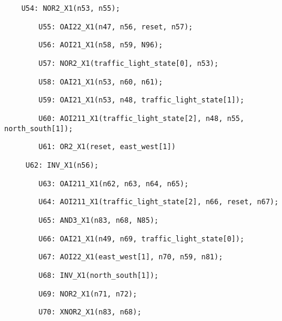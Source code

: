 \documentclass[a4paper]{article}
\begin{document}
{\centering \par}

\begin{center}
\begin{minipage}{6.03611in}
{\color[rgb]{0.0,0.0,0.039215688}
\texttt{\ \ \ \ U54: NOR2\_X1(n53, n55);}}

{\color[rgb]{0.0,0.0,0.039215688}
\texttt{\ \ \ \ \ \ \ \ U55: OAI22\_X1(n47, n56, reset, n57);}}

{\color[rgb]{0.0,0.0,0.039215688}
\texttt{\ \ \ \ \ \ \ \ U56: AOI21\_X1(n58, n59, N96);}}

{\color[rgb]{0.0,0.0,0.039215688}
\texttt{\ \ \ \ \ \ \ \ U57: NOR2\_X1(traffic\_light\_state[0], n53);}}

{\color[rgb]{0.0,0.0,0.039215688}
\texttt{\ \ \ \ \ \ \ \ U58: OAI21\_X1(n53, n60, n61);}}

{\color[rgb]{0.0,0.0,0.039215688}
\texttt{\ \ \ \ \ \ \ \ U59: OAI21\_X1(n53, n48,
traffic\_light\_state[1]);}}

{\color[rgb]{0.0,0.0,0.039215688}
\texttt{\ \ \ \ \ \ \ \ U60: AOI211\_X1(traffic\_light\_state[2], n48,
n55, north\_south[1]);}}

{\color[rgb]{0.0,0.0,0.039215688}
\texttt{\ \ \ \ \ \ \ \ U61: OR2\_X1(reset, east\_west[1])}}


\bigskip

{\color[rgb]{0.0,0.0,0.039215688}
\texttt{\ }\texttt{\ \ \ \ U62: INV\_X1(n56);}}

{\color[rgb]{0.0,0.0,0.039215688}
\texttt{\ \ \ \ \ \ \ \ U63: OAI211\_X1(n62, n63, n64, n65);}}

{\color[rgb]{0.0,0.0,0.039215688}
\texttt{\ \ \ \ \ \ \ \ U64: AOI211\_X1(traffic\_light\_state[2], n66,
reset, n67);}}

{\color[rgb]{0.0,0.0,0.039215688}
\texttt{\ \ \ \ \ \ \ \ U65: AND3\_X1(n83, n68, N85);}}

{\color[rgb]{0.0,0.0,0.039215688}
\texttt{\ \ \ \ \ \ \ \ U66: OAI21\_X1(n49, n69,
traffic\_light\_state[0]);}}

{\color[rgb]{0.0,0.0,0.039215688}
\texttt{\ \ \ \ \ \ \ \ U67: AOI22\_X1(east\_west[1], n70, n59, n81);}}

{\color[rgb]{0.0,0.0,0.039215688}
\texttt{\ \ \ \ \ \ \ \ U68: INV\_X1(north\_south[1]);}}

{\color[rgb]{0.0,0.0,0.039215688}
\texttt{\ \ \ \ \ \ \ \ U69: NOR2\_X1(n71, n72);}}

{\color[rgb]{0.0,0.0,0.039215688}
\texttt{\ \ \ \ \ \ \ \ U70: XNOR2\_X1(n83, n68);}}


\end{minipage}
\end{center}
\end{document}
